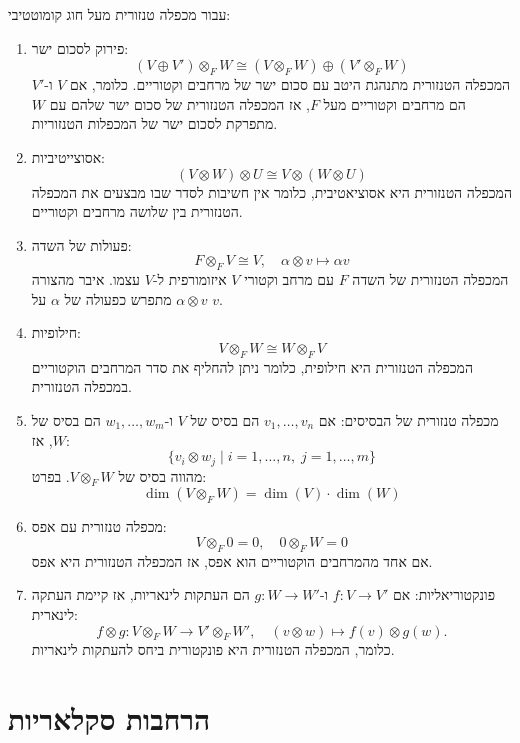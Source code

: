 \documentclass{tstextbook}
\begin{document}
\begin{proposition}
עבור מכפלה טנזורית מעל חוג קומוטטיבי:

  \begin{enumerate}
    \item פירוק לסכום ישר: 
$$(V \oplus V') \otimes_{F} W \cong (V \otimes_{F} W) \oplus (V' \otimes_{F} W)$$
המכפלה הטנזורית מתנהגת היטב עם סכום ישר של מרחבים וקטוריים. כלומר, אם \(V\) ו-\(V'\) הם מרחבים וקטוריים מעל \(F\), אז המכפלה הטנזורית של סכום ישר שלהם עם \(W\) מתפרקת לסכום ישר של המכפלות הטנזוריות.


    \item אסוצייטיביות: 
$$(V \otimes W) \otimes U \cong V \otimes (W \otimes U)$$
המכפלה הטנזורית היא אסוציאטיבית, כלומר אין חשיבות לסדר שבו מבצעים את המכפלה הטנזורית בין שלושה מרחבים וקטוריים.


    \item פעולות של השדה: 
$$F \otimes_{F} V \cong V, \quad \alpha \otimes v \mapsto \alpha v$$
המכפלה הטנזורית של השדה \(F\) עם מרחב וקטורי \(V\) איזומורפית ל-\(V\) עצמו. איבר מהצורה \(\alpha \otimes v\) מתפרש כפעולה של \(\alpha\) על \(v\).


    \item חילופיות: 
$$V \otimes_{F} W \cong W \otimes_{F} V$$
המכפלה הטנזורית היא חילופית, כלומר ניתן להחליף את סדר המרחבים הוקטוריים במכפלה הטנזורית.


    \item מכפלה טנזורית של הבסיסים: 
אם \(v_1, \dots, v_n\) הם בסיס של \(V\) ו-\(w_1, \dots, w_m\) הם בסיס של \(W\), אז:
$$\{v_i \otimes w_j \mid i=1,\dots,n, \; j=1,\dots,m\}$$
מהווה בסיס של \(V \otimes_{F} W\). בפרט:
$$\dim(V \otimes_{F} W) = \dim(V) \cdot \dim(W)$$


    \item מכפלה טנזורית עם אפס:\\
$$V \otimes_{F} 0 = 0, \quad 0 \otimes_{F} W = 0$$
אם אחד מהמרחבים הוקטוריים הוא אפס, אז המכפלה הטנזורית היא אפס.


    \item פונקטוריאליות: אם \(f: V \to V'\) ו-\(g: W \to W'\) הם העתקות לינאריות, אז קיימת העתקה לינארית: 
$$f \otimes g: V \otimes_{F} W \to V' \otimes_{F} W', \quad (v \otimes w) \mapsto f(v) \otimes g(w).$$
כלומר, המכפלה הטנזורית היא פונקטורית ביחס להעתקות לינאריות.


  \end{enumerate}
\end{proposition}
\section{הרחבות סקלאריות}
\end{document}

